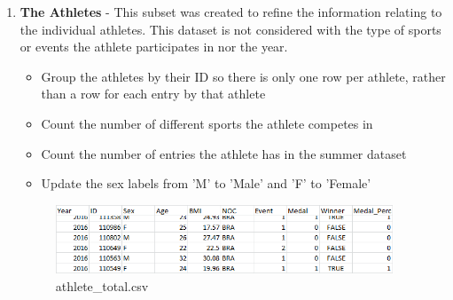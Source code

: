 \documentclass[a4 paper, 12pt]{article}
\begin{document}
        \begin{enumerate} 
            \item \textbf{The Athletes} - This subset was created to refine the information relating to the individual athletes. This dataset is not considered with the type of sports or events the athlete participates in nor the year. 
                \begin{itemize}
                    \item Group the athletes by their ID so there is only one row per athlete, rather than a row for each entry by that athlete
                    \item Count the number of different sports the athlete competes in
                    \item Count the number of entries the athlete has in the summer dataset
                    \item Update the sex labels from 'M' to 'Male' and 'F' to 'Female'
                \end{itemize}
                \begin{figure} [H]
                    \centering
                    \includegraphics[width=0.95\textwidth, frame]
                        {./images/data/athlete_total.png}      
                        \caption{athlete\_total.csv} 
                \end{figure}


\end{enumerate}
\end{document}
